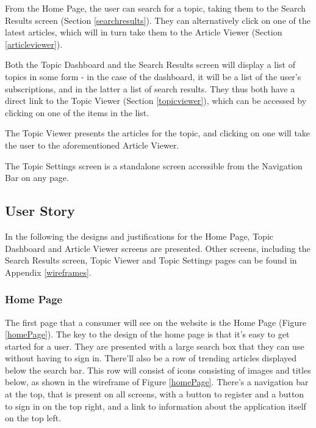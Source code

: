 \documentclass[12pt]{article}
\begin{document}
From the Home Page, the user can search for a topic, taking them to the Search Results screen (Section \ref{searchresults}). They can alternatively click on one of the latest articles, which will in turn take them to the Article Viewer (Section \ref{articleviewer}).

Both the Topic Dashboard and the Search Results screen will display a list of topics in some form - in the case of the dashboard, it will be a list of the user's subscriptions, and in the latter a list of search results. They thus both have a direct link to the Topic Viewer (Section \ref{topicviewer}), which can be accessed by clicking on one of the items in the list.

The Topic Viewer presents the articles for the topic, and clicking on one will take the user to the aforementioned Article Viewer.

The Topic Settings screen is a standalone screen accessible from the Navigation Bar on any page.

\subsection{User Story}

\label{userstory}

In the following the designs and justifications for the Home Page, Topic Dashboard and Article Viewer screens are presented. Other screens, including the Search Results screen, Topic Viewer and Topic Settings pages can be found in Appendix \ref{wireframes}.

\subsubsection{Home Page}

The first page that a consumer will see on the website is the Home Page (Figure \ref{homePage}). The key to the design of the home page is that it's easy to get started for a user. They are presented with a large search box that they can use without having to sign in. There'll also be a row of trending articles displayed below the search bar. This row will consist of icons consisting of images and titles below, as shown in the wireframe of Figure \ref{homePage}. There's a navigation bar at the top, that is present on all screens, with a button to register and a button to sign in on the top right, and a link to information about the application itself on the top left.

\label{homepage}
\end{document}
